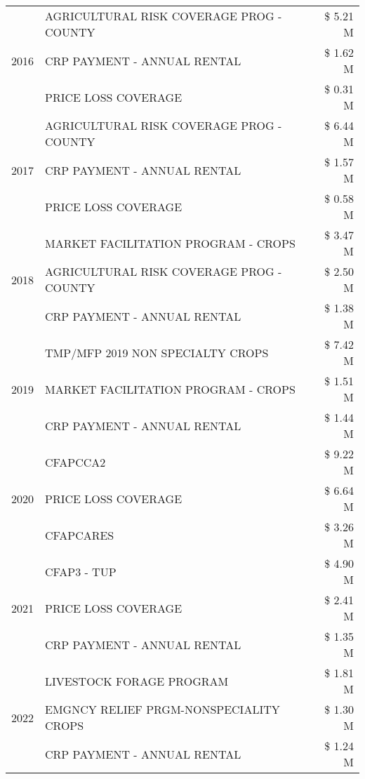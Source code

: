 \begin{tabular}{llr}
\cline{1-3}
\multirow[t]{3}{*}{2016} & AGRICULTURAL RISK COVERAGE PROG - COUNTY & \$ 5.21 M \\
 & CRP PAYMENT - ANNUAL RENTAL & \$ 1.62 M \\
 & PRICE LOSS COVERAGE & \$ 0.31 M \\
\cline{1-3}
\multirow[t]{3}{*}{2017} & AGRICULTURAL RISK COVERAGE PROG - COUNTY & \$ 6.44 M \\
 & CRP PAYMENT - ANNUAL RENTAL & \$ 1.57 M \\
 & PRICE LOSS COVERAGE & \$ 0.58 M \\
\cline{1-3}
\multirow[t]{3}{*}{2018} & MARKET FACILITATION PROGRAM - CROPS & \$ 3.47 M \\
 & AGRICULTURAL RISK COVERAGE PROG - COUNTY & \$ 2.50 M \\
 & CRP PAYMENT - ANNUAL RENTAL & \$ 1.38 M \\
\cline{1-3}
\multirow[t]{3}{*}{2019} & TMP/MFP 2019 NON SPECIALTY CROPS & \$ 7.42 M \\
 & MARKET FACILITATION PROGRAM - CROPS & \$ 1.51 M \\
 & CRP PAYMENT - ANNUAL RENTAL & \$ 1.44 M \\
\cline{1-3}
\multirow[t]{3}{*}{2020} & CFAPCCA2 & \$ 9.22 M \\
 & PRICE LOSS COVERAGE & \$ 6.64 M \\
 & CFAPCARES & \$ 3.26 M \\
\cline{1-3}
\multirow[t]{3}{*}{2021} & CFAP3 - TUP & \$ 4.90 M \\
 & PRICE LOSS COVERAGE & \$ 2.41 M \\
 & CRP PAYMENT - ANNUAL RENTAL & \$ 1.35 M \\
\cline{1-3}
\multirow[t]{3}{*}{2022} & LIVESTOCK FORAGE PROGRAM & \$ 1.81 M \\
 & EMGNCY RELIEF PRGM-NONSPECIALITY CROPS & \$ 1.30 M \\
 & CRP PAYMENT - ANNUAL RENTAL & \$ 1.24 M \\
\cline{1-3}
\bottomrule
\end{tabular}

